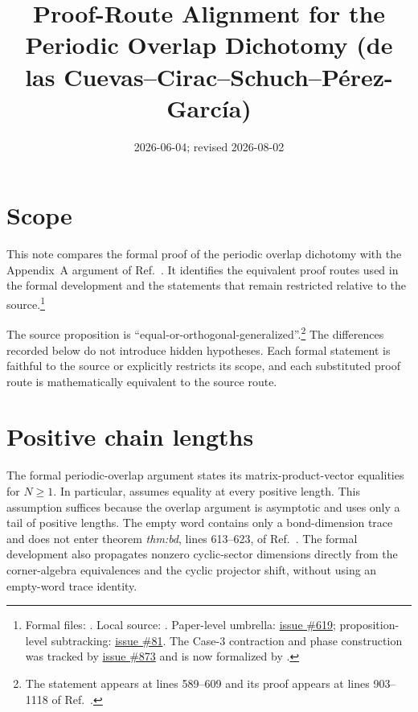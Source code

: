 \documentclass{article}
\title{Proof-Route Alignment for the Periodic Overlap Dichotomy
  (de las Cuevas--Cirac--Schuch--P\'erez-Garc\'ia)}
\author{}
\date{2026-06-04; revised 2026-08-02}
\begin{document}
\maketitle
{}

\section{Scope}

This note compares the formal proof of the periodic overlap dichotomy with the
Appendix~A argument of Ref.~\cite{DeLasCuevas2017Irreducible}. It identifies
the equivalent proof routes used in the formal development and the statements
that remain restricted relative to the source.\footnote{Formal files:
. Local source:
. Paper-level umbrella:
\href{https://github.com/LionSR/TNLean/issues/619}{issue \#619};
proposition-level subtracking:
\href{https://github.com/LionSR/TNLean/issues/81}{issue \#81}. The Case-3
contraction and phase construction was tracked by
\href{https://github.com/LionSR/TNLean/issues/873}{issue \#873} and is now
formalized by .}

The source proposition is ``equal-or-orthogonal-generalized''.\footnote{The
statement appears at lines 589--609 and its proof appears at lines 903--1118
of Ref.~\cite{DeLasCuevas2017Irreducible}.} The differences recorded below do
not introduce hidden hypotheses. Each formal statement is faithful to the
source or explicitly restricts its scope, and each substituted proof route is
mathematically equivalent to the source route.

\section{Positive chain lengths}

The formal periodic-overlap argument states its matrix-product-vector
equalities for $N\geq 1$. In particular,
 assumes equality
at every positive length. This assumption suffices because the overlap
argument is asymptotic and uses only a tail of positive lengths. The empty word
contains only a bond-dimension trace and does not enter theorem
\emph{thm:bd}, lines 613--623, of
Ref.~\cite{DeLasCuevas2017Irreducible}. The formal development also propagates
nonzero cyclic-sector dimensions directly from the corner-algebra
equivalences and the cyclic projector shift, without using an empty-word trace
identity.
\end{document}
